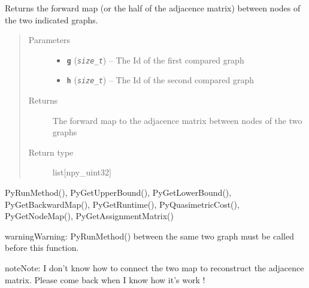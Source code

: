 \documentclass[letterpaper,10pt,english]{sphinxmanual}
\begin{document}

\begin{fulllineitems}
\label{doc:PythonGedLib.PyGetForwardMap}
Returns the forward map (or the half of the adjacence matrix) between nodes of the two indicated graphs.
\begin{quote}\begin{description}
\item[{Parameters}] \leavevmode\begin{itemize}
\item {} 
\textbf{\texttt{g}} (\emph{\texttt{size\_t}}) -- The Id of the first compared graph

\item {} 
\textbf{\texttt{h}} (\emph{\texttt{size\_t}}) -- The Id of the second compared graph

\end{itemize}

\item[{Returns}] \leavevmode
The forward map to the adjacence matrix between nodes of the two graphs

\item[{Return type}] \leavevmode
list{[}npy\_uint32{]}

\end{description}\end{quote}




PyRunMethod(), PyGetUpperBound(), PyGetLowerBound(), PyGetBackwardMap(), PyGetRuntime(), PyQuasimetricCost(), PyGetNodeMap(), PyGetAssignmentMatrix()



\begin{notice}{warning}{Warning:}
PyRunMethod() between the same two graph must be called before this function.
\end{notice}

\begin{notice}{note}{Note:}
I don't know how to connect the two map to reconstruct the adjacence matrix. Please come back when I know how it's work !
\end{notice}

\end{fulllineitems}

\end{document}
